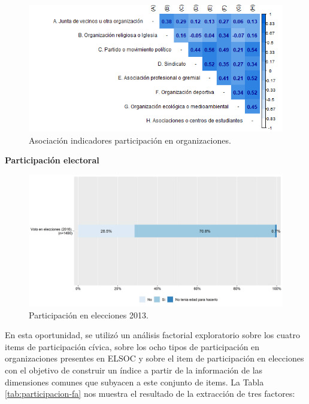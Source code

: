 \documentclass[
  12pt,
]{book}
\begin{document}
\begin{figure}[H]

{\centering \includegraphics[width=1\linewidth,height=1\textheight]{output/graphs/participacion-organizaciones_cor} 

}

\caption{Asociación indicadores participación en organizaciones.}\label{fig:participacion-organizaciones-cor}
\end{figure}

\textbf{Participación electoral}

\begin{figure}[H]

{\centering \includegraphics[width=1\linewidth,height=1\textheight]{output/graphs/participacion-electoral} 

}

\caption{Participación en elecciones 2013.}\label{fig:participacion-electoral}
\end{figure}

En esta oportunidad, se utilizó un análisis factorial exploratorio sobre los cuatro items de participación cívica, sobre los ocho tipos de participación en organizaciones presentes en ELSOC y sobre el item de participación en elecciones con el objetivo de construir un índice a partir de la información de las dimensiones comunes que subyacen a este conjunto de items. La Tabla \ref{tab:participacion-fa} nos muestra el resultado de la extracción de tres factores:
\end{document}
